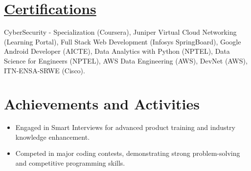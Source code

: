 \documentclass[a4paper,10pt]{article}
\begin{document}
\section{ \href{https://certificates7878.glitch.me/}{Certifications}}


\textrm{
\hspace{-3pt}CyberSecurity - Specialization (Coursera), Juniper Virtual Cloud Networking (Learning Portal), Full Stack Web Development (Infosys SpringBoard), Google Android Developer (AICTE), Data Analytics with Python (NPTEL), Data Science for Engineers (NPTEL), AWS Data Engineering (AWS), DevNet (AWS), ITN-ENSA-SRWE (Cisco).
}




\section{Achievements and Activities}

\vspace{5pt}
\begin{itemize}

    \item Engaged in Smart Interviews for advanced product training and industry knowledge enhancement.\vspace{-5pt}
    \item Competed in major coding contests, demonstrating strong problem-solving and competitive programming skills.\vspace{-5pt}
\end{itemize}
\end{document}
